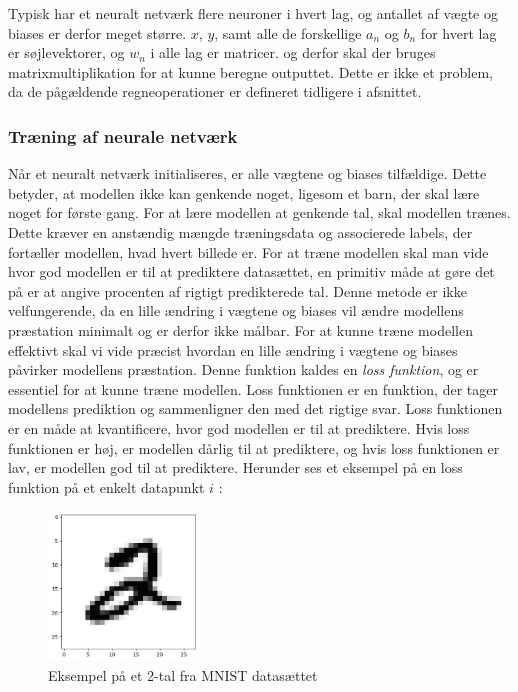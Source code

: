 \documentclass{article}
\begin{document}
Typisk har et neuralt netværk flere neuroner i hvert lag, og antallet af vægte og biases er derfor meget større. $x$, $y$, samt alle de forskellige $a_n$ og $b_n$ for hvert lag er søjlevektorer, og $w_n$ i alle lag er matricer. og derfor skal der bruges matrixmultiplikation for at kunne beregne outputtet. Dette er ikke et problem, da de pågældende regneoperationer er defineret tidligere i afsnittet.  

\subsubsection{Træning af neurale netværk}
Når et neuralt netværk initialiseres, er alle vægtene og biases tilfældige. \parencite{Sanderson_2017} Dette betyder, at modellen ikke kan genkende noget, ligesom et barn, der skal lære noget for første gang. For at lære modellen at genkende tal, skal modellen trænes. Dette kræver en anstændig mængde træningsdata og associerede labels, der fortæller modellen, hvad hvert billede er. For at træne modellen skal man vide hvor god modellen er til at prediktere datasættet, en primitiv måde at gøre det på er at angive procenten af rigtigt predikterede tal. Denne metode er ikke velfungerende, da en lille ændring i vægtene og biases vil ændre modellens præstation minimalt og er derfor ikke målbar. For at kunne træne modellen effektivt skal vi vide præcist hvordan en lille ændring i vægtene og biases påvirker modellens præstation. Denne funktion kaldes en \textit{loss funktion}, og er essentiel for at kunne træne modellen. Loss funktionen er en funktion, der tager modellens prediktion og sammenligner den med det rigtige svar. Loss funktionen er en måde at kvantificere, hvor god modellen er til at prediktere. Hvis loss funktionen er høj, er modellen dårlig til at prediktere, og hvis loss funktionen er lav, er modellen god til at prediktere. Herunder ses et eksempel på en loss funktion på et enkelt datapunkt $i$ \parencite{Sanderson_2017}:
\begin{figure}
  \includegraphics[width=4cm]{mnist2.jpg}
  \vspace{-0.8cm}
  \caption{Eksempel på et 2-tal fra MNIST datasættet \parencite{LeCun_1994}}
  \label{fig:mnist2}
\end{figure}
\end{document}
